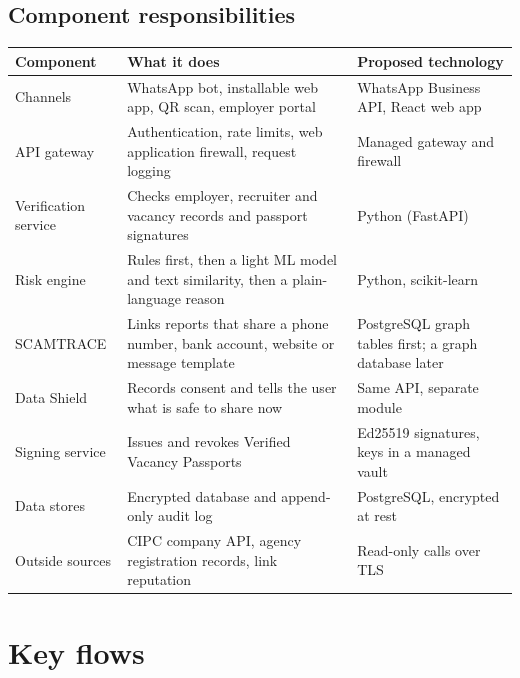 \documentclass[11pt,a4paper]{article}
\newcommand{\tbl}[1]{\textbf{#1}}
\begin{document}
\subsection{Component responsibilities}
\begin{center}
\small
\begin{tabularx}{\textwidth}{@{}>{\raggedright\arraybackslash}p{3.0cm}>{\raggedright\arraybackslash}X>{\raggedright\arraybackslash}p{4.3cm}@{}}
\toprule
\tbl{Component} & \tbl{What it does} & \tbl{Proposed technology}\\
\midrule
Channels & WhatsApp bot, installable web app, QR scan, employer portal & WhatsApp Business API, React web app\\
API gateway & Authentication, rate limits, web application firewall, request logging & Managed gateway and firewall\\
Verification service & Checks employer, recruiter and vacancy records and passport signatures & Python (FastAPI)\\
Risk engine & Rules first, then a light ML model and text similarity, then a plain-language reason & Python, scikit-learn\\
SCAMTRACE & Links reports that share a phone number, bank account, website or message template & PostgreSQL graph tables first; a graph database later\\
Data Shield & Records consent and tells the user what is safe to share now & Same API, separate module\\
Signing service & Issues and revokes Verified Vacancy Passports & Ed25519 signatures, keys in a managed vault\\
Data stores & Encrypted database and append-only audit log & PostgreSQL, encrypted at rest\\
Outside sources & CIPC company API, agency registration records, link reputation & Read-only calls over TLS\\
\bottomrule
\end{tabularx}
\end{center}

\section{Key flows}
\end{document}
